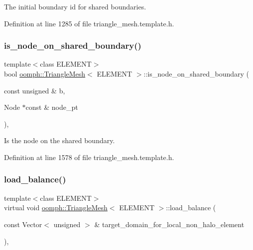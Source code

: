 The initial boundary id for shared boundaries. 



Definition at line 1285 of file triangle\+\_\+mesh.\+template.\+h.

\mbox{\label{classoomph_1_1TriangleMesh_a14bf5a67e8ce6cc64a38922b08af991c}} 
\subsubsection{\texorpdfstring{is\+\_\+node\+\_\+on\+\_\+shared\+\_\+boundary()}{is\_node\_on\_shared\_boundary()}}
{\footnotesize\ttfamily template$<$class E\+L\+E\+M\+E\+NT$>$ \\
bool \hyperlink{classoomph_1_1TriangleMesh}{oomph\+::\+Triangle\+Mesh}$<$ E\+L\+E\+M\+E\+NT $>$\+::is\+\_\+node\+\_\+on\+\_\+shared\+\_\+boundary (\begin{DoxyParamCaption}\item[{const unsigned \&}]{b,  }\item[{Node $\ast$const \&}]{node\+\_\+pt }\end{DoxyParamCaption})\hspace{0.3cm}{\ttfamily [inline]}, {\ttfamily [protected]}}



Is the node on the shared boundary. 



Definition at line 1578 of file triangle\+\_\+mesh.\+template.\+h.

\mbox{\label{classoomph_1_1TriangleMesh_a712bfd68d4b55e9c475347c0146fc8ac}} 
\subsubsection{\texorpdfstring{load\+\_\+balance()}{load\_balance()}}
{\footnotesize\ttfamily template$<$class E\+L\+E\+M\+E\+NT$>$ \\
virtual void \hyperlink{classoomph_1_1TriangleMesh}{oomph\+::\+Triangle\+Mesh}$<$ E\+L\+E\+M\+E\+NT $>$\+::load\+\_\+balance (\begin{DoxyParamCaption}\item[{const Vector$<$ unsigned $>$ \&}]{target\+\_\+domain\+\_\+for\+\_\+local\+\_\+non\+\_\+halo\+\_\+element }\end{DoxyParamCaption})\hspace{0.3cm}{\ttfamily [inline]}, {\ttfamily [virtual]}}



